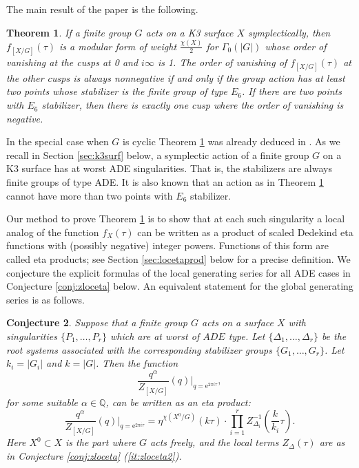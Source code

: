\documentclass[11pt,a4paper]{amsart}
\newtheorem{theorem}{Theorem}[section]
\newtheorem{conjecture}[theorem]{Conjecture}
\theoremstyle{definition}
\begin{document}
The main result of the paper is the following.
\begin{theorem} 
\label{thm:k3global}	
If a finite group $G$ acts on a K3 surface $X$ symplectically, then $f_{[X/G]}(\tau)$ is a modular form of weight $\frac{\chi(X)}{2}$ for $\Gamma_0(|G|)$ whose order of vanishing at the cusps at 0 and $i\infty$ is 1. The order of vanishing of $f_{[X/G]}(\tau)$ at the other cusps is always nonnegative if and only if the group action has at least two points whose stabilizer is the finite group of type $E_6$. If there are two points with $E_6$ stabilizer, then there is exactly one cusp where the order of vanishing is negative.
\end{theorem}
In the special case when $G$ is cyclic Theorem \ref{thm:k3global} was already deduced in \cite{bryan2018chl}. As we recall in Section \ref{sec:k3surf} below, a symplectic action of a finite group $G$ on a K3 surface has at worst ADE singularities. That is, the stabilizers are always finite groups of type ADE. It is also known that an action as in Theorem \ref{thm:k3global} cannot have more than two points with $E_6$ stabilizer. 

Our method to prove Theorem \ref{thm:k3global} is to show that at each such singularity a local analog of the function $f_{X}(\tau)$ can be written as a product of scaled Dedekind eta functions with (possibly negative) integer powers. Functions of this form are called eta products; see Section \ref{sec:locetaprod} below for a precise definition.
We conjecture the explicit formulas of the local generating series for all ADE cases in Conjecture \ref{conj:zloceta} below. An equivalent statement for the global generating series is as follows.
\begin{conjecture} 
	\label{conj:adesurfeta}	
Suppose that a finite group $G$ acts on a surface $X$ with singularities $\{P_1,\dots,P_r\}$ which are at worst of $ADE$ type. Let $\{ \Delta_1, \dots, \Delta_r \}$ be the  root systems associated with the corresponding stabilizer groups $\{ G_1,\dots,G_r \}$. Let $k_i=|G_i|$ and $k=|G|$. Then the function
\[ \frac{q^{\alpha}}{Z_{[X/G]}}(q)\Big|_{q=\mathrm{e}^{2 \pi i \tau}},\]
for some suitable $\alpha \in \mathbb{Q}$, can be written as an eta product:
\[ \frac{q^{\alpha}}{Z_{[X/G]}}(q)\Big|_{q=\mathrm{e}^{2 \pi i \tau}}=  \eta^{\chi(X^0/G)}(k \tau) \cdot \prod_{i=1}^r Z_{\Delta_i}^{-1}\left(\frac{k}{k_i} \tau\right). \]
Here $X^0 \subset X$ is the part where $G$ acts freely, and the local terms $Z_{\Delta}(\tau)$ are as in Conjecture \ref{conj:zloceta} (\ref{it:zloceta2}).
\end{conjecture}
\end{document}
